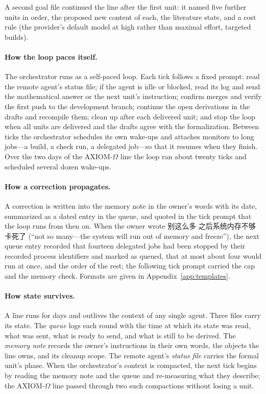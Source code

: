 \documentclass[11pt]{article}
\newcommand{\zh}[1]{#1}
\begin{document}
A second goal file continued the line after the first unit: it named five
further units in order, the proposed new content of each, the literature
state, and a cost rule (the provider's default model at high rather than
maximal effort, targeted builds).

\paragraph{How the loop paces itself.} The orchestrator runs as a
self-paced loop. Each tick follows a fixed prompt: read the remote agent's
status file; if the agent is idle or blocked, read its log and send the
mathematical answer or the next unit's instruction; confirm merges and
verify the first push to the development branch; continue the open
derivations in the drafts and recompile them; clean up after each delivered
unit; and stop the loop when all units are delivered and the drafts agree
with the formalization. Between ticks the orchestrator schedules its own
wake-ups and attaches monitors to long jobs---a build, a check run, a
delegated job---so that it resumes when they finish. Over the two days of the
AXIOM-$\Omega$ line the loop ran about twenty ticks and scheduled several
dozen wake-ups.

\paragraph{How a correction propagates.} A correction is written into the
memory note in the owner's words with its date, summarized as a dated entry
in the queue, and quoted in the tick prompt that the loop runs from then on.
When the owner wrote \zh{别这么多 之后系统内存不够卡死了} (``not so many---the
system will run out of memory and freeze''), the next queue entry recorded
that fourteen delegated jobs had been stopped by their recorded process
identifiers and marked as queued, that at most about four would run at once,
and the order of the rest; the following tick prompt carried the cap and the
memory check. Formats are given in Appendix~\ref{app:templates}.

\paragraph{How state survives.} A line runs for days and outlives the
context of any single agent. Three files carry its state. The \emph{queue}
logs each round with the time at which its state was read, what was sent,
what is ready to send, and what is still to be derived. The \emph{memory
note} records the owner's instructions in their own words, the objects the
line owns, and its cleanup scope. The remote agent's \emph{status file}
carries the formal unit's phase. When the orchestrator's context is
compacted, the next tick begins by reading the memory note and the queue and
re-measuring what they describe; the AXIOM-$\Omega$ line passed through two
such compactions without losing a unit.
\end{document}
